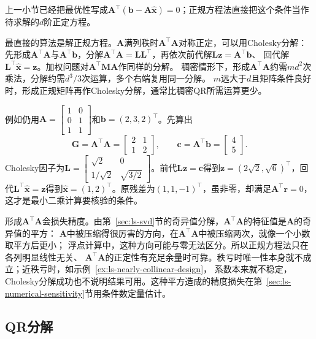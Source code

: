 上一小节已经把最优性写成$\bm A^\top(\bm b-\bm A\hat{\bm x})=0$；正规方程法直接把这个条件当作待求解的$d$阶正定方程。

最直接的算法是解正规方程。$\bm A$满列秩时$\bm A^\top\bm A$对称正定，可以用Cholesky分解：
先形成$\bm A^\top\bm A$与$\bm A^\top\bm b$，分解$\bm A^\top\bm A=\bm L\bm L^\top$，再依次前代解$\bm L\bm z=\bm A^\top\bm b$、
回代解$\bm L^\top\hat{\bm x}=\bm z$。加权问题对$\bm A^\top\bm M\bm A$作同样的分解。
稠密情形下，形成$\bm A^\top\bm A$约需$md^2$次乘法，分解约需$d^3/3$次运算，多个右端复用同一分解。
$m$远大于$d$且矩阵条件良好时，形成正规矩阵再作Cholesky分解，通常比稠密QR所需运算更少。

例如仍用$\bm A=\left[\begin{smallmatrix}1&0\\0&1\\1&1\end{smallmatrix}\right]$和$\bm b=(2,3,2)^\top$。先算出
\[
 \bm G=\bm A^\top\bm A=\begin{bmatrix}2&1\\1&2\end{bmatrix},\qquad
 \bm c=\bm A^\top\bm b=\begin{bmatrix}4\\5\end{bmatrix}.
\]
Cholesky因子为$\bm L=\left[\begin{smallmatrix}\sqrt2&0\\1/\sqrt2&\sqrt{3/2}\end{smallmatrix}\right]$。前代$\bm L\bm z=\bm c$得到$\bm z=(2\sqrt2,\sqrt6)^\top$，回代$\bm L^\top\hat{\bm x}=\bm z$得到$\hat{\bm x}=(1,2)^\top$。原残差为$(1,1,-1)^\top$，虽非零，却满足$\bm A^\top\bm r=0$，这才是最小二乘计算要核验的条件。

形成$\bm A^\top\bm A$会损失精度。由第~\ref{sec:ls-svd}节的奇异值分解，$\bm A^\top\bm A$的特征值是$\bm A$的奇异值的平方：
$\bm A$中被压缩得很厉害的方向，在$\bm A^\top\bm A$中被压缩两次，就像一个小数取平方后更小；
浮点计算中，这种方向可能与零无法区分。所以正规方程法只在各列明显线性无关、
$\bm A^\top\bm A$的正定性有充足余量时可靠。秩亏时唯一性本身就不成立；近秩亏时，如示例~\ref{ex:ls-nearly-collinear-design}，
系数本来就不稳定，Cholesky分解成功也不说明结果可用。这种平方造成的精度损失在第~\ref{sec:ls-numerical-sensitivity}节用条件数定量估计。

\subsection{QR分解}
\label{sec:ls-qr-method}
\label{sec:linear-algebra-direct-residual}

